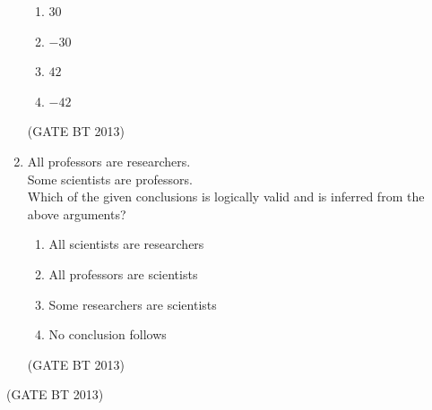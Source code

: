 \documentclass[journal,12pt,onecolumn]{IEEEtran}
\theoremstyle{remark}
\begin{document}
\begin{enumerate}
\begin{enumerate}
    \item $30$
    \item $-30$
    \item $42$
    \item $-42$
\end{enumerate} \hfill(GATE BT 2013)

\item 

All professors are researchers. \\
Some scientists are professors. \\

Which of the given conclusions is logically valid and is inferred from the above arguments?

\begin{enumerate}
    \item All scientists are researchers
    \item All professors are scientists
    \item Some researchers are scientists
    \item No conclusion follows
\end{enumerate} \hfill(GATE BT 2013)
\end{enumerate} \hfill(GATE BT 2013)
\end{document}
